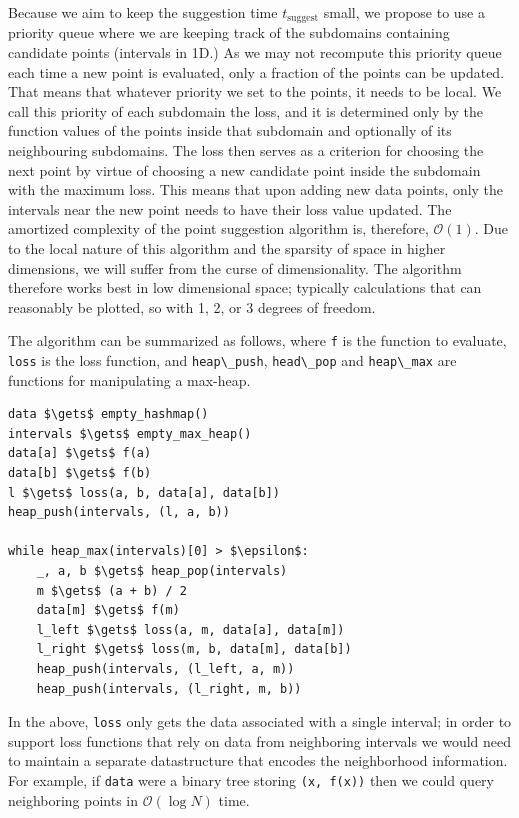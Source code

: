 Because we aim to keep the suggestion time $t_\textrm{suggest}$ small, we propose to use a priority queue where we are keeping track of the subdomains containing candidate points (intervals in 1D.)
As we may not recompute this priority queue each time a new point is evaluated, only a fraction of the points can be updated.
That means that whatever priority we set to the points, it needs to be local.
We call this priority of each subdomain the loss, and it is determined only by the function values of the points inside that subdomain and optionally of its neighbouring subdomains.
The loss then serves as a criterion for choosing the next point by virtue of choosing a new candidate point inside the subdomain with the maximum loss.
This means that upon adding new data points, only the intervals near the new point needs to have their loss value updated.
The amortized complexity of the point suggestion algorithm is, therefore, $\mathcal{O}(1)$.
Due to the local nature of this algorithm and the sparsity of space in higher dimensions, we will suffer from the curse of dimensionality.
The algorithm therefore works best in low dimensional space; typically calculations that can reasonably be plotted, so with 1, 2, or 3 degrees of freedom.

The algorithm can be summarized as follows, where \passthrough{\lstinline!f!} is the function to evaluate, \passthrough{\lstinline!loss!} is the loss function, and \passthrough{\lstinline!heap\_push!}, \passthrough{\lstinline!head\_pop!} and \passthrough{\lstinline!heap\_max!} are functions for manipulating a max-heap.

\begin{lstlisting}
data $\gets$ empty_hashmap()
intervals $\gets$ empty_max_heap()
data[a] $\gets$ f(a)
data[b] $\gets$ f(b)
l $\gets$ loss(a, b, data[a], data[b])
heap_push(intervals, (l, a, b))

while heap_max(intervals)[0] > $\epsilon$:
    _, a, b $\gets$ heap_pop(intervals)
    m $\gets$ (a + b) / 2
    data[m] $\gets$ f(m)
    l_left $\gets$ loss(a, m, data[a], data[m])
    l_right $\gets$ loss(m, b, data[m], data[b])
    heap_push(intervals, (l_left, a, m))
    heap_push(intervals, (l_right, m, b))
\end{lstlisting}

In the above, \passthrough{\lstinline!loss!} only gets the data associated with a single interval;
in order to support loss functions that rely on data from neighboring intervals we would need to maintain a separate datastructure that encodes the neighborhood information.
For example, if \passthrough{\lstinline!data!} were a binary tree storing \passthrough{\lstinline!(x, f(x))!} then we could query neighboring points in $\mathcal{O}(\log N)$ time.

